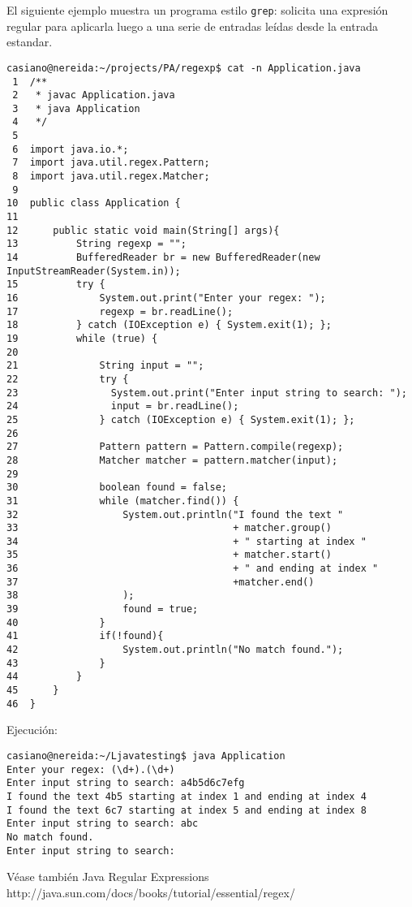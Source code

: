 El siguiente ejemplo muestra un programa estilo \verb|grep|: solicita
una expresión regular para aplicarla luego a una serie de entradas 
leídas desde la entrada estandar.
\begin{verbatim}
casiano@nereida:~/projects/PA/regexp$ cat -n Application.java
 1  /**
 2   * javac Application.java
 3   * java Application
 4   */
 5
 6  import java.io.*;
 7  import java.util.regex.Pattern;
 8  import java.util.regex.Matcher;
 9
10  public class Application {
11
12      public static void main(String[] args){
13          String regexp = "";
14          BufferedReader br = new BufferedReader(new InputStreamReader(System.in));
15          try {
16              System.out.print("Enter your regex: ");
17              regexp = br.readLine();
18          } catch (IOException e) { System.exit(1); };
19          while (true) {
20
21              String input = "";
22              try {
23                System.out.print("Enter input string to search: ");
24                input = br.readLine();
25              } catch (IOException e) { System.exit(1); };
26
27              Pattern pattern = Pattern.compile(regexp);
28              Matcher matcher = pattern.matcher(input);
29
30              boolean found = false;
31              while (matcher.find()) {
32                  System.out.println("I found the text "
33                                     + matcher.group()
34                                     + " starting at index "
35                                     + matcher.start()
36                                     + " and ending at index "
37                                     +matcher.end()
38                  );
39                  found = true;
40              }
41              if(!found){
42                  System.out.println("No match found.");
43              }
44          }
45      }
46  }
\end{verbatim}
Ejecución:
\begin{verbatim}
casiano@nereida:~/Ljavatesting$ java Application
Enter your regex: (\d+).(\d+)
Enter input string to search: a4b5d6c7efg
I found the text 4b5 starting at index 1 and ending at index 4
I found the text 6c7 starting at index 5 and ending at index 8
Enter input string to search: abc
No match found.
Enter input string to search:
\end{verbatim}

Véase también 
\htmladdnormallink
{Java Regular Expressions}
{http://java.sun.com/docs/books/tutorial/essential/regex/}


